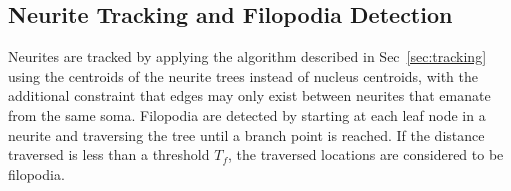 \subsection{Neurite Tracking and Filopodia Detection}
\label{sec:neurite}
\vspace{-2mm}
Neurites are tracked by applying the algorithm described in Sec~\ref{sec:tracking} using
the centroids of the neurite trees instead of nucleus centroids, with the additional 
constraint that edges may only exist between neurites that emanate from the same soma.
Filopodia are detected by starting at each leaf node in a neurite and traversing the tree until a branch
point is reached. If the distance traversed is less than a threshold $T_f$, the traversed locations
are considered to be filopodia.




